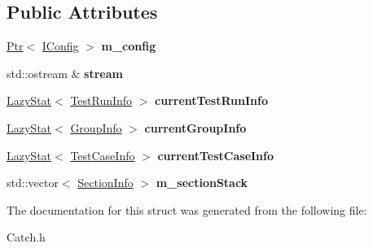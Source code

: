 \subsection*{Public Attributes}
\begin{DoxyCompactItemize}
\item 
\hypertarget{struct_catch_1_1_streaming_reporter_base_a7d77cac272194543ed81dea9f5c4f3a0}{\hyperlink{class_catch_1_1_ptr}{Ptr}$<$ \hyperlink{struct_catch_1_1_i_config}{I\-Config} $>$ {\bfseries m\-\_\-config}}\label{struct_catch_1_1_streaming_reporter_base_a7d77cac272194543ed81dea9f5c4f3a0}

\item 
\hypertarget{struct_catch_1_1_streaming_reporter_base_aee935c9ec91eca10af8598a88258bde4}{std\-::ostream \& {\bfseries stream}}\label{struct_catch_1_1_streaming_reporter_base_aee935c9ec91eca10af8598a88258bde4}

\item 
\hypertarget{struct_catch_1_1_streaming_reporter_base_af4d83c6abacdbcc7790497f0d50545af}{\hyperlink{struct_catch_1_1_lazy_stat}{Lazy\-Stat}$<$ \hyperlink{struct_catch_1_1_test_run_info}{Test\-Run\-Info} $>$ {\bfseries current\-Test\-Run\-Info}}\label{struct_catch_1_1_streaming_reporter_base_af4d83c6abacdbcc7790497f0d50545af}

\item 
\hypertarget{struct_catch_1_1_streaming_reporter_base_aae9f9ccd5346f51d378fc19d5de5d868}{\hyperlink{struct_catch_1_1_lazy_stat}{Lazy\-Stat}$<$ \hyperlink{struct_catch_1_1_group_info}{Group\-Info} $>$ {\bfseries current\-Group\-Info}}\label{struct_catch_1_1_streaming_reporter_base_aae9f9ccd5346f51d378fc19d5de5d868}

\item 
\hypertarget{struct_catch_1_1_streaming_reporter_base_a8bd70da6d93c21962a2628c3e84991b5}{\hyperlink{struct_catch_1_1_lazy_stat}{Lazy\-Stat}$<$ \hyperlink{struct_catch_1_1_test_case_info}{Test\-Case\-Info} $>$ {\bfseries current\-Test\-Case\-Info}}\label{struct_catch_1_1_streaming_reporter_base_a8bd70da6d93c21962a2628c3e84991b5}

\item 
\hypertarget{struct_catch_1_1_streaming_reporter_base_a82f2a7a5dec58bc093f6ab26a9e47bd8}{std\-::vector$<$ \hyperlink{struct_catch_1_1_section_info}{Section\-Info} $>$ {\bfseries m\-\_\-section\-Stack}}\label{struct_catch_1_1_streaming_reporter_base_a82f2a7a5dec58bc093f6ab26a9e47bd8}

\end{DoxyCompactItemize}


The documentation for this struct was generated from the following file\-:\begin{DoxyCompactItemize}
\item 
Catch.\-h\end{DoxyCompactItemize}
